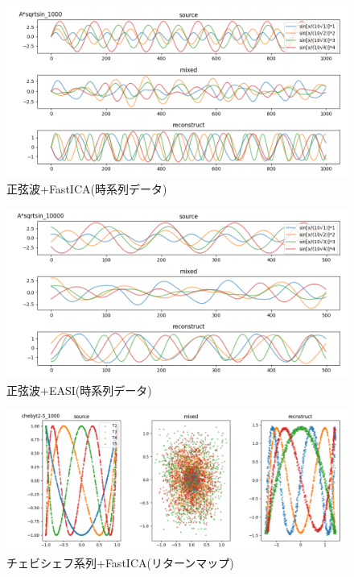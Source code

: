 \documentclass{jsarticle}
\begin{document}
\begin{figure}[H]
    \begin{center}
        \includegraphics[width=13cm]{img/sqrtsin-fastica.png}
        \caption{正弦波+FastICA(時系列データ)}
        \label{img:sqrtsin-fastica}
    \end{center}
\end{figure}
\begin{figure}[H]
    \begin{center}
        \includegraphics[width=13cm]{img/sqrtsin-easi.png}
        \caption{正弦波+EASI(時系列データ)}
        \label{img:sqrtsin-easi}
    \end{center}
\end{figure}
\begin{figure}[H]
    \begin{center}
        \includegraphics[width=13cm]{img/cyebit-fastica.png}
        \caption{チェビシェフ系列+FastICA(リターンマップ)}
        \label{img:cyebit-fastica}
    \end{center}
\end{figure}
\end{document}
